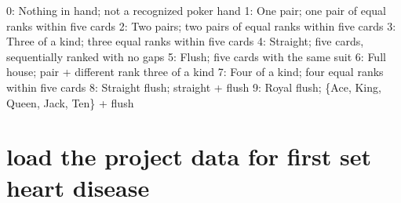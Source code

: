 \documentclass[]{article}
\begin{document}
0: Nothing in hand; not a recognized poker hand 1: One pair; one pair of
equal ranks within five cards 2: Two pairs; two pairs of equal ranks
within five cards 3: Three of a kind; three equal ranks within five
cards 4: Straight; five cards, sequentially ranked with no gaps 5:
Flush; five cards with the same suit 6: Full house; pair + different
rank three of a kind 7: Four of a kind; four equal ranks within five
cards 8: Straight flush; straight + flush 9: Royal flush; \{Ace, King,
Queen, Jack, Ten\} + flush

\section{load the project data for first set heart
disease}\label{load-the-project-data-for-first-set-heart-disease-1}
\end{document}
